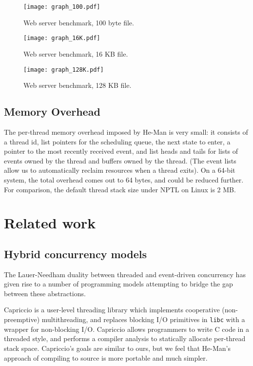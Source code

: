 \documentclass[preprint]{sigplanconf}
\renewcommand{\t}{\texttt}
\begin{document}
\begin{figure*}[htbp]
\centering
\texttt{[image: graph\_100.pdf]}
\caption{Web server benchmark, 100 byte file.}
\label{fig:graph100}
\end{figure*}
\begin{figure*}[htbp]
\centering
\texttt{[image: graph\_16K.pdf]}
\caption{Web server benchmark, 16 KB file.}
\label{fig:graph16}
\end{figure*}
\begin{figure*}[htbp]
\centering
\texttt{[image: graph\_128K.pdf]}
\caption{Web server benchmark, 128 KB file.}
\label{fig:graph128}
\end{figure*}

\subsection{Memory Overhead}

The per-thread memory overhead imposed by He-Man is very small: it consists of a
thread id, list pointers for the scheduling queue, the next state to enter, a
pointer to the most recently received event, and list heads and tails for lists
of events owned by the thread and buffers owned by the thread.  (The event lists
allow us to automatically reclaim resources when a thread exits). On a 64-bit
system, the total overhead comes out to 64 bytes, and could be reduced further.
For comparison, the default thread stack size under NPTL on Linux is 2 MB.

\section{Related work}

\subsection{Hybrid concurrency models}

The Lauer-Needham duality \cite{LauerNeedham} between threaded and event-driven
concurrency has given rise to a number of programming models attempting to
bridge the gap between these abstractions. 

Capriccio \cite{vonBehrenEtAl} is a user-level threading library which
implements cooperative (non-preemptive) multithreading, and replaces blocking
I/O primitives in \t{libc} with a wrapper for non-blocking I/O. Capriccio allows
programmers to write C code in a threaded style, and performs a compiler
analysis to statically allocate per-thread stack space. Capriccio's goals are
similar to ours, but we feel that He-Man's approach of compiling to source is
more portable and much simpler.
\end{document}
